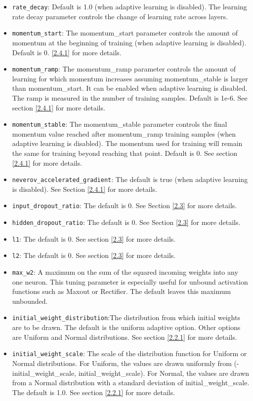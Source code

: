 \documentclass[11pt]{article}
\begin{document}
\begin{itemize}
\item \texttt{rate\_decay}: Default is 1.0 (when adaptive learning is disabled). The learning rate decay parameter controls the change of learning rate across layers.
\item \texttt{momentum\_start}: The momentum\_start parameter controls the amount of momentum at the beginning of training (when adaptive learning is disabled). Default is 0. \ref{2.4.1} for more details.
\item \texttt{momentum\_ramp}: The momentum\_ramp parameter controls the amount of learning for which momentum increases assuming momentum\_stable is larger than momentum\_start. It can be enabled when adaptive learning is disabled. The ramp is measured in the number of training samples. Default is 1e-6. See section \ref{2.4.1} for more details.
\item \texttt{momentum\_stable}: The momentum\_stable parameter controls the final momentum value reached after momentum\_ramp training samples (when adaptive learning is disabled). The momentum used for training will remain the same for training beyond reaching that point. Default is 0.  See section \ref{2.4.1} for more details.
\item \texttt{neverov\_accelerated\_gradient}: The default is true (when adaptive learning is disabled). See Section \ref{2.4.1} for more details.
\item \texttt{input\_dropout\_ratio}: The default is 0. See Section \ref{2.3} for more details.
\item \texttt{hidden\_dropout\_ratio}: The default is 0. See Section \ref{2.3} for more details.
\item \texttt{l1}: The default is 0. See section \ref{2.3} for more details.
\item \texttt{l2}: The default is 0. See section \ref{2.3} for more details.
\item \texttt{max\_w2}: A maximum on the sum of the squared incoming weights into any one neuron. This tuning parameter is especially useful for unbound activation functions such as Maxout or Rectifier. The default leaves this maximum unbounded.
\item \texttt{initial\_weight\_distribution}:The distribution from which initial weights are to be drawn. The default is the uniform adaptive option. Other options are Uniform and Normal distributions. See section \ref{2.2.1} for more details.
\item \texttt{initial\_weight\_scale}: The scale of the distribution function for Uniform or Normal distributions. For Uniform, the values are drawn uniformly from (-initial\_weight\_scale, initial\_weight\_scale). For Normal, the values are drawn from a Normal distribution with a standard deviation of initial\_weight\_scale. The default is 1.0. See section \ref{2.2.1} for more details.

\end{itemize}
\end{document}
